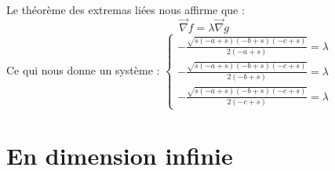 \documentclass[12pt]{report}
\begin{document}
\indent Le théorème des extremas liées nous affirme que : 
\begin{equation}
   \overrightarrow{\nabla}f = \lambda \overrightarrow{\nabla}g
\end{equation}
Ce qui nous donne un système :
$\begin{cases} - \frac{\sqrt{s \left(- a + s\right) \left(- b + s\right) \left(- c + s\right)}}{2 \left(- a + s\right)} = \lambda \\
- \frac{\sqrt{s \left(- a + s\right) \left(- b + s\right) \left(- c + s\right)}}{2 \left(- b + s\right)} = \lambda \\
- \frac{\sqrt{s \left(- a + s\right) \left(- b + s\right) \left(- c + s\right)}}{2 \left(- c + s\right)} = \lambda \end{cases}$











\part{En dimension infinie}
\end{document}
